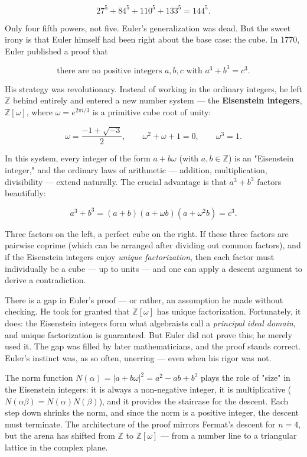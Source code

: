\[27^5 + 84^5 + 110^5 + 133^5 = 144^5.\]

Only four fifth powers, not five. Euler's generalization was dead. But the sweet irony is that Euler himself had been right about the base case: the cube. In 1770, Euler published a proof that

\[\text{there are no positive integers } a, b, c \text{ with } a^3 + b^3 = c^3.\]

His strategy was revolutionary. Instead of working in the ordinary integers, he left $\mathbb{Z}$ behind entirely and entered a new number system --- the \textbf{Eisenstein integers}, $\mathbb{Z}[\omega]$, where $\omega = e^{2\pi i / 3}$ is a primitive cube root of unity:

\[\omega = \frac{-1 + \sqrt{-3}}{2}, \qquad \omega^2 + \omega + 1 = 0, \qquad \omega^3 = 1.\]

In this system, every integer of the form $a + b\omega$ (with $a, b \in \mathbb{Z}$) is an "Eisenstein integer," and the ordinary laws of arithmetic --- addition, multiplication, divisibility --- extend naturally. The crucial advantage is that $a^3 + b^3$ factors beautifully:

\[a^3 + b^3 = (a + b)(a + \omega b)(a + \omega^2 b) = c^3.\]

Three factors on the left, a perfect cube on the right. If these three factors are pairwise coprime (which can be arranged after dividing out common factors), and if the Eisenstein integers enjoy \textit{unique factorization}, then each factor must individually be a cube --- up to units --- and one can apply a descent argument to derive a contradiction.


There is a gap in Euler's proof --- or rather, an assumption he made without checking. He took for granted that $\mathbb{Z}[\omega]$ has unique factorization. Fortunately, it does: the Eisenstein integers form what algebraists call a \textit{principal ideal domain}, and unique factorization is guaranteed. But Euler did not prove this; he merely used it. The gap was filled by later mathematicians, and the proof stands correct. Euler's instinct was, as so often, unerring --- even when his rigor was not.


The norm function $N(\alpha) = |a + b\omega|^2 = a^2 - ab + b^2$ plays the role of "size" in the Eisenstein integers: it is always a non-negative integer, it is multiplicative ($N(\alpha\beta) = N(\alpha)N(\beta)$), and it provides the staircase for the descent. Each step down shrinks the norm, and since the norm is a positive integer, the descent must terminate. The architecture of the proof mirrors Fermat's descent for $n = 4$, but the arena has shifted from $\mathbb{Z}$ to $\mathbb{Z}[\omega]$ --- from a number line to a triangular lattice in the complex plane.


